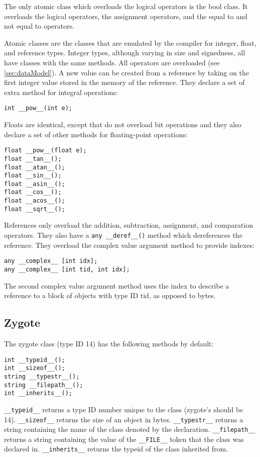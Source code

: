 \documentclass[10pt,a4paper]{article}
\begin{document}
The only atomic class which overloads the logical operators is the bool class. It overloads the logical operators, the assignment operators, and the equal to and not equal to operators.

Atomic classes are the classes that are emulated by the compiler for integer, float, and reference types. Integer types, although varying in size and signedness, all have classes with the same methods. All operators are overloaded (see \ref{sec:dataModel}). A new value can be created from a reference by taking on the first integer value stored in the memory of the reference. They declare a set of extra method for integral operations:
\begin{verbatim}
int __pow__(int e);
\end{verbatim}

Floats are identical, except that do not overload bit operations and they also declare a set of other methods for floating-point operations:
\begin{verbatim}
float __pow__(float e);
float __tan__();
float __atan__();
float __sin__();
float __asin__();
float __cos__();
float __acos__();
float __sqrt__();
\end{verbatim}

References only overload the addition, subtraction, assignment, and comparation operators. They also have a \verb|any __deref__()| method which dereferences the reference. They overload the complex value argument method to provide indexes:
\begin{verbatim}
any __complex__ [int idx];
any __complex__ [int tid, int idx];
\end{verbatim}

The second complex value argument method uses the index to describe a reference to a block of objects with type ID tid, as opposed to bytes. 

\subsection{Zygote}
The zygote class (type ID 14) has the following methods by default:
\begin{verbatim}
int __typeid__();
int __sizeof__();
string __typestr__();
string __filepath__();
int __inherits__();
\end{verbatim}

\verb|__typeid__| returns a type ID number unique to the class (zygote's should be 14). \verb|__sizeof__| returns the size of an object in bytes. \verb|__typestr__| returns a string containing the name of the class denoted by the declaration. \verb|__filepath__| returns a string containing the value of the \verb|__FILE__| token that the class was declared in. \verb|__inherits__| returns the typeid of the class inherited from.
\end{document}
